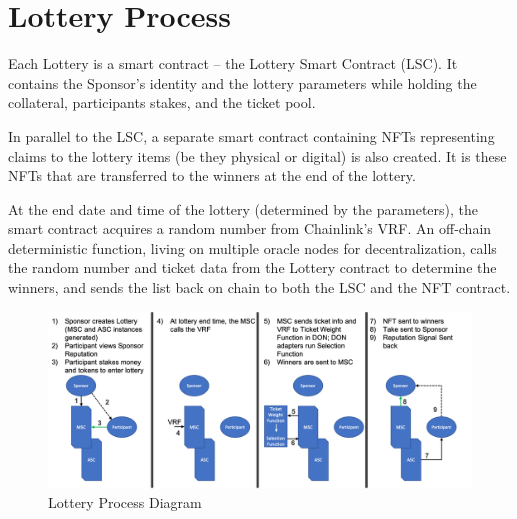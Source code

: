\documentclass[runningheads]{llncs}
\begin{document}
\section{Lottery Process}\label{section-LotteryProcess}
Each Lottery is a smart contract – the Lottery Smart Contract (LSC).  It contains the Sponsor’s identity and the lottery parameters while holding the collateral, participants stakes, and the ticket pool.

In parallel to the LSC, a separate smart contract containing NFTs representing claims to the lottery items (be they physical or digital) is also created.  It is these NFTs that are transferred to the winners at the end of the lottery.

At the end date and time of the lottery (determined by the parameters), the smart contract acquires a random number from Chainlink’s VRF.  An off-chain deterministic function, living on multiple oracle nodes for decentralization, calls the random number and ticket data from the Lottery contract to determine the winners, and sends the list back on chain to both the LSC and the NFT contract.

\begin{figure}[H]
\centering
\includegraphics[scale=0.4]{Figures_and_Tables/LotteryProcessDiagram.png}
\caption{Lottery Process Diagram}
\end{figure}
\end{document}
